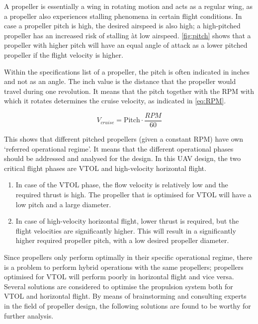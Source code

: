 A propeller is essentially a wing in rotating motion and acts as a regular wing, as a propeller also experiences stalling phenomena in certain flight conditions. In case a propeller pitch is high, the desired airspeed is also high; a high-pitched propeller has an increased risk of stalling àt low airspeed. \autoref{fig:pitch} shows that a propeller with higher pitch will have an equal angle of attack as a lower pitched propeller if the flight velocity is higher. 

Within the specifications list of a propeller, the pitch is often indicated in inches and not as an angle. The inch value is the distance that the propeller would travel during one revolution. It means that the pitch together with the RPM with which it rotates determines the cruise velocity, as indicated in \autoref{eq:RPM}.


\begin{equation}
\label{eq:RPM}
    V_{cruise} = \textrm{Pitch} \cdot \frac{RPM}{60}
\end{equation}

This shows that different pitched propellers (given a constant RPM) have own `referred operational regime'. It means that the different operational phases should be addressed and analysed for the design. In this UAV design, the two critical flight phases are VTOL and high-velocity horizontal flight. 
\begin{enumerate}
    \item In case of the VTOL phase, the flow velocity is relatively low and the required thrust is high. The propeller that is optimised for VTOL will have a low pitch and a large diameter.
    \item In case of high-velocity horizontal flight, lower thrust is required, but the flight velocities are significantly higher. This will result in a significantly higher required propeller pitch, with a low desired propeller diameter.
\end{enumerate}


Since propellers only perform optimally in their specific operational regime, there is a problem to perform hybrid operations with the same propellers; propellers optimised for VTOL will perform poorly in horizontal flight and vice versa. Several solutions are considered to optimise the propulsion system both for VTOL and horizontal flight. By means of brainstorming and consulting experts in the field of propeller design, the following solutions are found to be worthy for further analysis.\\

